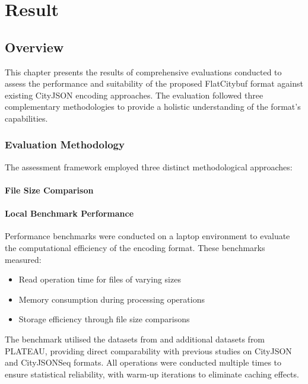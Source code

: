 \chapter{Result}
\label{chp:result}

\section{Overview}
\label{result:overview}

This chapter presents the results of comprehensive evaluations conducted to assess the performance and suitability of the proposed FlatCitybuf format against existing CityJSON encoding approaches. The evaluation followed three complementary methodologies to provide a holistic understanding of the format's capabilities.

\subsection{Evaluation Methodology}
\label{result:overview:evaluation_methodology}

The assessment framework employed three distinct methodological approaches:

\subsubsection{File Size Comparison}
\label{result:overview:file_size_comparison}

\subsubsection{Local Benchmark Performance}
\label{result:overview:local_benchmark_performance}

Performance benchmarks were conducted on a laptop environment to evaluate the computational efficiency of the encoding format. These benchmarks measured:
\begin{itemize}
  \item Read operation time for files of varying sizes
  \item Memory consumption during processing operations
  \item Storage efficiency through file size comparisons
\end{itemize}

The benchmark utilised the datasets from \citet{ledoux_2024} and additional datasets from PLATEAU, providing direct comparability with previous studies on CityJSON and CityJSONSeq formats. All operations were conducted multiple times to ensure statistical reliability, with warm-up iterations to eliminate caching effects.


